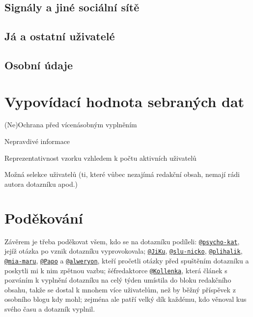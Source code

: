 \documentclass[12pt, a4paper, twoside]{article}
\makeatletter
\newcommand{\suser}[1]{\href{https://www.signaly.cz/#1}{\texttt{@#1}}}
\makeatother
\begin{document}
\subsection{Signály a jiné sociální sítě}\label{sec:jinesite}

\subsection{Já a ostatní uživatelé}\label{sec:ostatniuzivatele}

\subsection{Osobní údaje}\label{sec:osobni}

\section{Vypovídací hodnota sebraných dat}

(Ne)Ochrana před vícenásobným vyplněním

Nepravdivé informace

Reprezentativnost vzorku vzhledem k počtu aktivních uživatelů

Možná selekce uživatelů (ti, které vůbec nezajímá redakční obsah,
nemají rádi autora dotazníku apod.)

\section*{Poděkování}

Závěrem je třeba poděkovat všem, kdo se na dotazníku podíleli:
\suser{psycho-kat}, jejíž otázka po 
vznik dotazníku vyprovokovala;
\suser{JiKu}, \suser{slu-nicko}, \suser{plihalik}, \suser{mia-maru},
\suser{Papo} a \suser{alweryon}, kteří pročetli otázky před spuštěním
dotazníku a poskytli mi k nim zpětnou vazbu;
šéfredaktorce \suser{Kollenka}, která článek s pozváním k vyplnění
dotazníku na celý týden umístila do bloku redakčního obsahu,
takže se dostal
k mnohem více uživatelům, než by běžný příspěvek z osobního blogu
kdy mohl;
zejména ale patří velký dík každému, kdo věnoval kus svého času
a dotazník vyplnil.

\printbibliography
\end{document}
